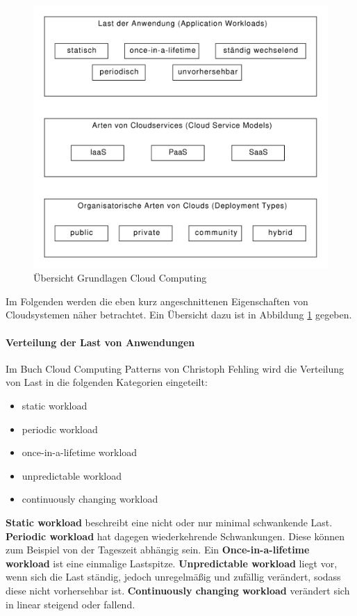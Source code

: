 \documentclass[a4paper,10pt]{article}
\begin{document}
\begin{figure}[htbp]
\centering
\caption{Übersicht Grundlagen Cloud Computing}
\label{fig:cloudComputingOverview}
\includegraphics[width=\textwidth]{graphics/cloudComputingOverview.pdf}
\end{figure}

Im Folgenden werden die eben kurz angeschnittenen Eigenschaften von Cloudsystemen näher betrachtet.
Ein Übersicht dazu ist in Abbildung \ref{fig:cloudComputingOverview} gegeben.

\paragraph{Verteilung der Last von Anwendungen}

Im Buch Cloud Computing Patterns von Christoph Fehling wird die Verteilung von Last in die folgenden Kategorien eingeteilt:

\begin{itemize}
 \item static workload
 \item periodic workload
 \item once-in-a-lifetime workload
 \item unpredictable workload
 \item continuously changing workload
\end{itemize}

\textbf{Static workload} beschreibt eine nicht oder nur minimal schwankende Last.
\textbf{Periodic workload} hat dagegen wiederkehrende Schwankungen. Diese können zum Beispiel von der Tageszeit abhängig sein.
Ein \textbf{Once-in-a-lifetime workload} ist eine einmalige Lastspitze.
\textbf{Unpredictable workload} liegt vor, wenn sich die Last ständig, jedoch unregelmäßig und zufällig verändert, sodass diese nicht vorhersehbar ist.
\textbf{Continuously changing workload} verändert sich in linear steigend oder fallend.
\end{document}
